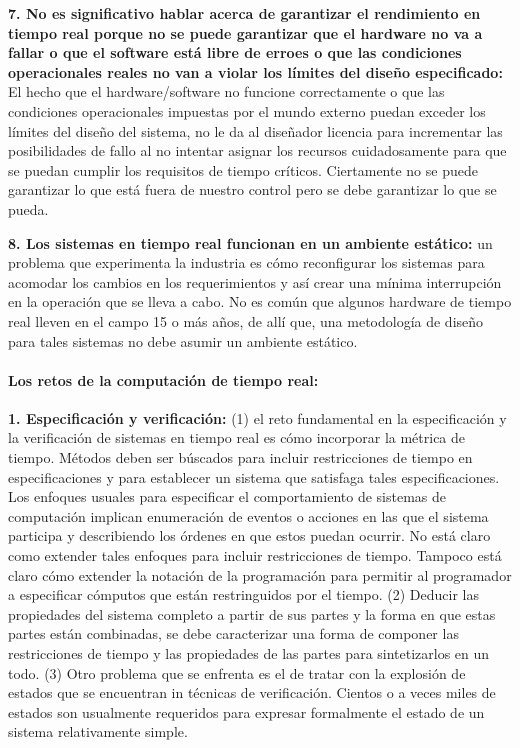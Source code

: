 \textbf{7. No es significativo hablar acerca de garantizar el rendimiento en tiempo real porque no se puede garantizar que el hardware no va a fallar o que el software está libre de erroes o que las condiciones operacionales reales no van a violar los límites del diseño especificado:} El hecho que el hardware/software no funcione correctamente o que las condiciones operacionales  impuestas por el mundo externo puedan exceder los límites del diseño del sistema, no le da al diseñador licencia para incrementar las posibilidades de fallo al no intentar asignar los recursos cuidadosamente para que se puedan cumplir los requisitos de tiempo críticos. Ciertamente no se puede garantizar lo que está fuera de nuestro control pero se debe garantizar lo que se pueda. 

\textbf{8. Los sistemas en tiempo real funcionan en un ambiente estático:} un problema que experimenta la industria es cómo reconfigurar los sistemas para acomodar los cambios en los requerimientos y así crear una mínima interrupción en la operación que se lleva a cabo. No es común que algunos hardware de tiempo real lleven en el campo 15 o más años, de allí que, una metodología de diseño para tales sistemas no debe asumir un ambiente estático.

\paragraph{\textnormal{\textbf{Los retos de la computación de tiempo real:}}} \textbf{1. Especificación y verificación:} (1) el reto fundamental en la especificación y la verificación de sistemas en tiempo real es cómo incorporar la métrica de tiempo. Métodos deben ser búscados para incluir restricciones de tiempo en especificaciones y para establecer un sistema que satisfaga tales especificaciones. Los enfoques usuales para especificar el comportamiento de sistemas de computación implican enumeración de eventos o acciones en las que el sistema participa y describiendo los órdenes en que estos puedan ocurrir. No está claro como extender tales enfoques  para incluir restricciones de tiempo. Tampoco está claro cómo extender la notación de la programación para permitir al programador a especificar cómputos que están restringuidos por el tiempo. (2) Deducir las propiedades del sistema completo a partir de sus partes y la forma en que estas partes están combinadas, se debe caracterizar una forma de componer las restricciones de tiempo y las propiedades de las partes para sintetizarlos en un todo. (3) Otro problema que se enfrenta es el de tratar con la explosión de estados que se encuentran in técnicas de verificación. Cientos o a veces miles de estados son usualmente requeridos para expresar formalmente el estado de un sistema relativamente simple. 

